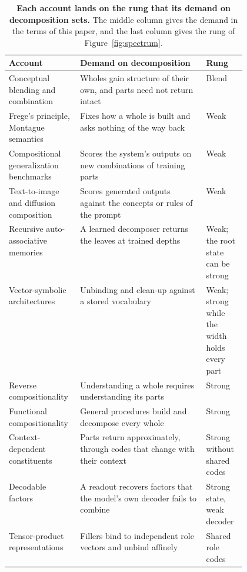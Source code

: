 \documentclass[10pt]{article}
\theoremstyle{plain}
\theoremstyle{remark}
\begin{document}
\begin{table}[t]
  \caption{\textbf{Each account lands on the rung that its demand on decomposition sets.} The middle column gives the demand in the terms of this paper, and the last column gives the rung of Figure~\ref{fig:spectrum}.}
  \label{tab:spectrum}
  \centering\small
  \begin{tabularx}{\linewidth}{@{}P{0.30\linewidth}YP{0.17\linewidth}@{}}
    \toprule
    Account & Demand on decomposition & Rung \\
    \midrule
    Conceptual blending and combination \citep{fauconnier2002,osherson1981,kamp1995} & Wholes gain structure of their own, and parts need not return intact & Blend \\
    \addlinespace
    Frege's principle, Montague semantics \citep{frege1923,montague1970} & Fixes how a whole is built and asks nothing of the way back & Weak \\
    Compositional generalization benchmarks \citep{lake2018,keysers2020,hupkes2020,lake2023} & Scores the system's outputs on new combinations of training parts & Weak \\
    Text-to-image and diffusion composition \citep{ramesh2021,okawa2023,favero2025diffusion} & Scores generated outputs against the concepts or rules of the prompt & Weak \\
    Recursive auto-associative memories \citep{pollack1990} & A learned decomposer returns the leaves at trained depths & Weak; the root state can be strong \\
    Vector-symbolic architectures \citep{plate1995,gayler2006,kanerva2009} & Unbinding and clean-up against a stored vocabulary & Weak; strong while the width holds every part \\
    \addlinespace
    Reverse compositionality \citep{fodor2002} & Understanding a whole requires understanding its parts & Strong \\
    Functional compositionality \citep{vangelder1990} & General procedures build and decompose every whole & Strong \\
    Context-dependent constituents \citep{smolensky1988} & Parts return approximately, through codes that change with their context & Strong without shared codes \\
    Decodable factors \citep{montero2021} & A readout recovers factors that the model's own decoder fails to combine & Strong state, weak decoder \\
    \addlinespace
    Tensor-product representations \citep{smolensky1990} & Fillers bind to independent role vectors and unbind affinely & Shared role codes \\

\end{tabularx}
\end{table}
\end{document}
